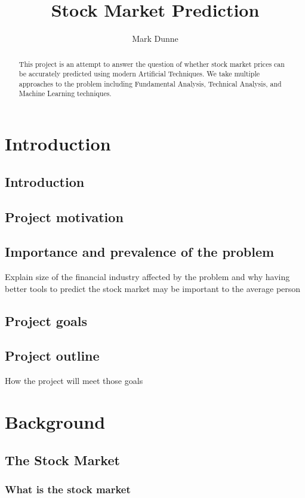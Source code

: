 \documentclass{report}
\title{Stock Market Prediction}
\author{Mark Dunne}
\begin{document}
\maketitle
\tableofcontents

\begin{abstract}

This project is an attempt to answer the question of whether stock market prices can be accurately predicted using modern Artificial Techniques. We take multiple approaches to the problem including Fundamental Analysis, Technical Analysis, and Machine Learning techniques.

\end{abstract}

\section{Introduction}
\subsection{Introduction}
\subsection{Project motivation}
\subsection{Importance and prevalence of the problem}
Explain size of the financial industry affected by the problem and why having better tools to predict the stock market may be important to the average person

\subsection{Project goals}

\subsection{Project outline}
How the project will meet those goals

\section{Background}
\subsection{The Stock Market}
\subsubsection{What is the stock market}
\end{document}
